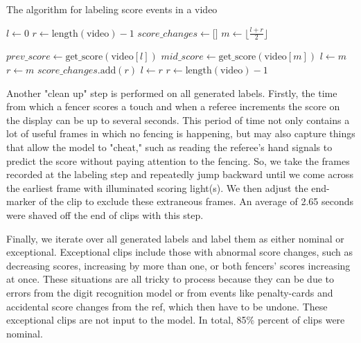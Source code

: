 \documentclass[10pt,twocolumn,letterpaper]{article}
\begin{document}
\begin{algorithm}
    \caption{The algorithm for labeling score events in a video}
    \begin{algorithmic}
        \State $l \gets 0$
        \State $r \gets \text{length}(\text{video}) - 1$
        \State $score\_changes \gets \text{[]}$
                \State $m \gets \lfloor \frac{l + r}{2} \rfloor$

                \State $prev\_score \gets \text{get\_score}(\text{video}[l])$
                \State $mid\_score \gets \text{get\_score}(\text{video}[m])$
                    \State $l \gets m$
                \Else
                    \State $r \gets m$
                \EndIf
            \EndWhile
            \State $score\_changes\text{.add}(r)$
            \State $l \gets r$
            \State $r \gets \text{length}(\text{video}) - 1$
        \EndWhile
    \end{algorithmic}
\end{algorithm}

Another "clean up" step is performed on all generated labels.
Firstly, the time from which a fencer scores a touch and when a referee increments the score on the display can be up to several seconds.
This period of time not only contains a lot of useful frames in which no fencing is happening, but may also capture things that allow the model to "cheat," such as reading the referee's hand signals to predict the score without paying attention to the fencing.
So, we take the frames recorded at the labeling step and repeatedly jump backward until we come across the earliest frame with illuminated scoring light(s).
We then adjust the end-marker of the clip to exclude these extraneous frames.
An average of 2.65 seconds were shaved off the end of clips with this step.

Finally, we iterate over all generated labels and label them as either nominal or exceptional.
Exceptional clips include those with abnormal score changes, such as decreasing scores, increasing by more than one, or both fencers' scores increasing at once.
These situations are all tricky to process because they can be due to errors from the digit recognition model or from events like penalty-cards and accidental score changes from the ref, which then have to be undone.
These exceptional clips are not input to the model.
In total, 85\% percent of clips were nominal.
\end{document}
